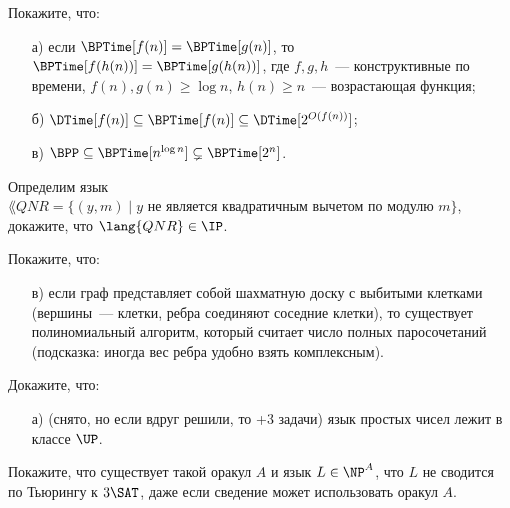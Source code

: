 \mytitle{}


\begin{ptask}{44}
    Покажите, что:
	\begin{enumerate}[topsep = 0pt, itemsep = -1ex]
        \item [а)] если $\BPTime[f(n)] = \BPTime[g(n)]$, то $\BPTime[f(h(n))] = \BPTime[g(h(n))]$, где $f, g, h$~---
			конструктивные по времени, $f(n), g(n) \ge \log n$, $h(n) \ge n$~--- возрастающая функция;
        \item [б)] $\DTime[f(n)] \subseteq \BPTime[f(n)] \subseteq \DTime[2^{O(f(n))}]$;
        \item [в)] $\BPP \subseteq \BPTime[n^{\log n}] \subsetneq \BPTime[2^n]$.
    \end{enumerate}
\end{ptask}

\begin{ptask}{45}
    Определим язык $\lang{QNR} = \{(y, m) \mid \text{$y$ не является квадратичным вычетом по модулю $m$}\}$, докажите, что
    $\lang{QNR} \in \IP$.
\end{ptask}


\begin{ptask}{49}
    Покажите, что:
    \begin{enumerate}[topsep = 0pt, itemsep = -1ex]
        \item [в)] если граф представляет собой шахматную доску с выбитыми клетками
            (вершины~--- клетки, ребра соединяют соседние клетки), то существует
            полиномиальный алгоритм, который считает число полных паросочетаний
            (подсказка: иногда вес ребра удобно взять комплексным).
    \end{enumerate}
\end{ptask}


\begin{ptask}{54}
    Докажите, что: 
    \begin{enumerate}[topsep = 0pt, itemsep = -1ex]
        \item [а)] (снято, но если вдруг решили, то +3 задачи) язык простых чисел лежит в классе $\UP$.
    \end{enumerate}
\end{ptask}

\begin{ptask}{55}
    Покажите, что существует такой оракул $A$ и язык $L \in \NP^A$, что $L$ не
    сводится по Тьюрингу к $3\SAT$, даже если сведение может использовать оракул $A$.
\end{ptask}

